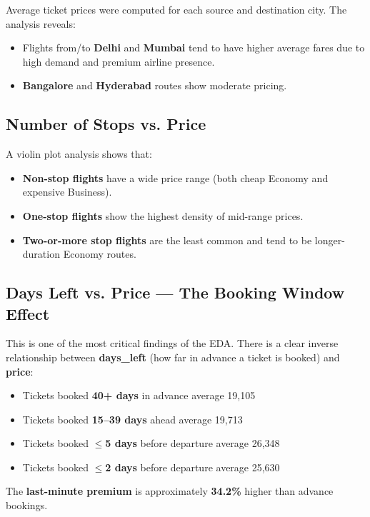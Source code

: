 \documentclass[12pt, a4paper]{article}
\newcommand{\rupee}{\text{₹}}
\begin{document}
Average ticket prices were computed for each source and destination city. The analysis reveals:
\begin{itemize}[leftmargin=*]
    \item Flights from/to \textbf{Delhi} and \textbf{Mumbai} tend to have higher average fares due to high demand and premium airline presence.
    \item \textbf{Bangalore} and \textbf{Hyderabad} routes show moderate pricing.
\end{itemize}

\subsection{Number of Stops vs. Price}

A violin plot analysis shows that:
\begin{itemize}[leftmargin=*]
    \item \textbf{Non-stop flights} have a wide price range (both cheap Economy and expensive Business).
    \item \textbf{One-stop flights} show the highest density of mid-range prices.
    \item \textbf{Two-or-more stop flights} are the least common and tend to be longer-duration Economy routes.
\end{itemize}

\subsection{Days Left vs. Price — The Booking Window Effect}

\begin{importantbox}
This is one of the most critical findings of the EDA. There is a clear inverse relationship between \textbf{days\_left} (how far in advance a ticket is booked) and \textbf{price}:
\begin{itemize}
    \item Tickets booked \textbf{40+ days} in advance average \rupee19,105
    \item Tickets booked \textbf{15--39 days} ahead average \rupee19,713
    \item Tickets booked \textbf{$\leq$5 days} before departure average \rupee26,348
    \item Tickets booked \textbf{$\leq$2 days} before departure average \rupee25,630
\end{itemize}
The \textbf{last-minute premium} is approximately \textbf{34.2\%} higher than advance bookings.
\end{importantbox}
\end{document}
